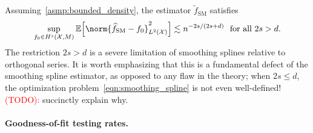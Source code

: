 \documentclass{article}
\newcommand{\1}{\mathbf{1}}
\newcommand{\Xset}{\mathcal{X}}
\newcommand{\Ebb}{\mathbb{E}}
\newcommand{\wt}[1]{\widetilde{#1}}
\newcommand{\wh}[1]{\widehat{#1}}
\newcommand{\SM}{\mathrm{SM}}
\theoremstyle{alden}
\theoremstyle{aldenthm}
\theoremstyle{definition}
\theoremstyle{remark}
\begin{document}
Assuming~\ref{asmp:bounded_density}, the estimator $\wt{f}_{\SM}$ satisfies
\begin{equation*}
\sup_{f_0 \in H^s(\Xset,M)}\Ebb\Bigl[\norm{\wh{f}_{\SM} - f_0}_{L^2(\Xset)}^2\Bigr]  \lesssim n^{-2s/(2s + d)}~~\textrm{for all $2s > d$.}
\end{equation*}
The restriction $2s > d$ is a severe limitation of smoothing splines relative to  orthogonal series. It is worth emphasizing that this is a fundamental defect of the smoothing spline estimator, as opposed to any flaw in the theory; when $2s \leq d$, the optimization problem~\eqref{eqn:smoothing_spline} is not even well-defined! \textcolor{red}{(TODO):} succinctly explain why.

\paragraph{Goodness-of-fit testing rates.} 
\end{document}
